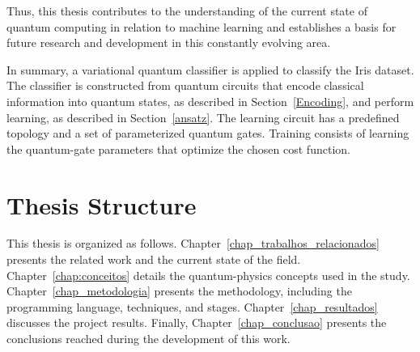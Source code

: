 Thus, this thesis contributes to the understanding of the current state of quantum computing in relation to machine learning and establishes a basis for future research and development in this constantly evolving area.

In summary, a variational quantum classifier \cite{Havlicek2019qSupervisedLearning} is applied to classify the Iris dataset. The classifier is constructed from quantum circuits that encode classical information into quantum states, as described in Section~\ref{Encoding}, and perform learning, as described in Section~\ref{ansatz}. The learning circuit has a predefined topology and a set of parameterized quantum gates. Training consists of learning the quantum-gate parameters that optimize the chosen cost function.

\section{Thesis Structure} \label{sec2}

This thesis is organized as follows. Chapter~\ref{chap_trabalhos_relacionados} presents the related work and the current state of the field. Chapter~\ref{chap:conceitos} details the quantum-physics concepts used in the study. Chapter~\ref{chap_metodologia} presents the methodology, including the programming language, techniques, and stages. Chapter~\ref{chap_resultados} discusses the project results. Finally, Chapter~\ref{chap_conclusao} presents the conclusions reached during the development of this work.